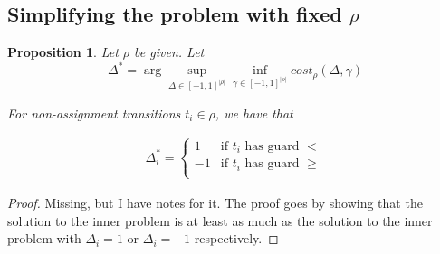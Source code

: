 \documentclass{article}
\newtheorem{proposition}{Proposition}[section]
\newtheorem{corollary}{Corollary}[theorem]
\newtheorem{definition}{Definition}[section]
\newcommand{\1}{\langle 1 \rangle}
\newcommand{\2}{\langle 2 \rangle}
\begin{document}




\subsection{Simplifying the problem with fixed $\rho$}

\begin{proposition}
    \label{prop:deltas_non_assignment}
    Let $\rho$ be given. Let \[\Delta^* = \arg \sup_{\Delta \in [-1, 1]^{|\rho|}} \inf_{\gamma \in [-1, 1]^{|\rho|}} cost_{\rho} (\Delta, \gamma)\]
    
    For non-assignment transitions $t_i \in \rho$, we have that 

    \begin{align*}
        \Delta_i^* = \begin{cases}
            1 & \text{if } t_i \text{ has guard } < \\
            -1 & \text{if } t_i \text{ has guard } \geq \\
        \end{cases}
    \end{align*}
\end{proposition}

\begin{proof}
    Missing, but I have notes for it. The proof goes by showing that the solution to the inner problem is at least as much as the solution to the inner problem with $\Delta_i = 1$ or $\Delta_i = -1$ respectively.
\end{proof}
\end{document}
